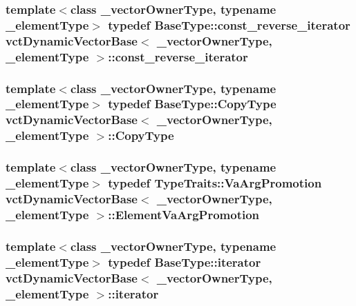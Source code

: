 \subsubsection[{const\+\_\+reverse\+\_\+iterator}]{\setlength{\rightskip}{0pt plus 5cm}template$<$class \+\_\+vector\+Owner\+Type, typename \+\_\+element\+Type$>$ typedef {\bf Base\+Type\+::const\+\_\+reverse\+\_\+iterator} {\bf vct\+Dynamic\+Vector\+Base}$<$ \+\_\+vector\+Owner\+Type, \+\_\+element\+Type $>$\+::{\bf const\+\_\+reverse\+\_\+iterator}}\label{classvct_dynamic_vector_base_a19db937e3f8b2fdc7c7d6e720c2bc9b3}
\hypertarget{classvct_dynamic_vector_base_a62fcc6341849207c5273566d0bce3cf5}{}
\subsubsection[{Copy\+Type}]{\setlength{\rightskip}{0pt plus 5cm}template$<$class \+\_\+vector\+Owner\+Type, typename \+\_\+element\+Type$>$ typedef {\bf Base\+Type\+::\+Copy\+Type} {\bf vct\+Dynamic\+Vector\+Base}$<$ \+\_\+vector\+Owner\+Type, \+\_\+element\+Type $>$\+::{\bf Copy\+Type}}\label{classvct_dynamic_vector_base_a62fcc6341849207c5273566d0bce3cf5}
\hypertarget{classvct_dynamic_vector_base_a74f36531adfd7ec68ac6500176134156}{}
\subsubsection[{Element\+Va\+Arg\+Promotion}]{\setlength{\rightskip}{0pt plus 5cm}template$<$class \+\_\+vector\+Owner\+Type, typename \+\_\+element\+Type$>$ typedef {\bf Type\+Traits\+::\+Va\+Arg\+Promotion} {\bf vct\+Dynamic\+Vector\+Base}$<$ \+\_\+vector\+Owner\+Type, \+\_\+element\+Type $>$\+::{\bf Element\+Va\+Arg\+Promotion}}\label{classvct_dynamic_vector_base_a74f36531adfd7ec68ac6500176134156}
\hypertarget{classvct_dynamic_vector_base_a5f711892fff6a5b01aa014db476f3084}{}
\subsubsection[{iterator}]{\setlength{\rightskip}{0pt plus 5cm}template$<$class \+\_\+vector\+Owner\+Type, typename \+\_\+element\+Type$>$ typedef {\bf Base\+Type\+::iterator} {\bf vct\+Dynamic\+Vector\+Base}$<$ \+\_\+vector\+Owner\+Type, \+\_\+element\+Type $>$\+::{\bf iterator}}\label{classvct_dynamic_vector_base_a5f711892fff6a5b01aa014db476f3084}
\hypertarget{classvct_dynamic_vector_base_ad569da2c70b9f9468f466f59535d53c7}{}
